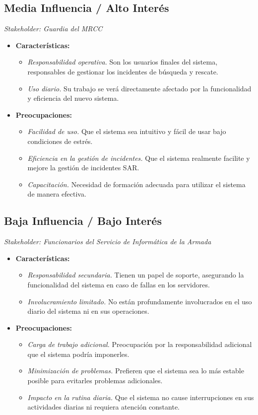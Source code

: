 \subsection{Media Influencia / Alto Interés} 
\textit{Stakeholder: Guardia del MRCC}
\begin{itemize}
    \item \textbf{Características:}
    \begin{itemize}
        \item \textit{Responsabilidad operativa.} Son los usuarios finales del sistema, responsables de gestionar los incidentes de búsqueda y rescate.
        \item \textit{Uso diario.} Su trabajo se verá directamente afectado por la funcionalidad y eficiencia del nuevo sistema.
    \end{itemize}
    \item \textbf{Preocupaciones:}
    \begin{itemize}
        \item \textit{Facilidad de uso.} Que el sistema sea intuitivo y fácil de usar bajo condiciones de estrés.
        \item \textit{Eficiencia en la gestión de incidentes.} Que el sistema realmente facilite y mejore la gestión de incidentes SAR.
        \item \textit{Capacitación.} Necesidad de formación adecuada para utilizar el sistema de manera efectiva.
    \end{itemize}
\end{itemize}


\subsection{Baja Influencia / Bajo Interés} 
\textit{Stakeholder: Funcionarios del Servicio de Informática de la Armada}
\begin{itemize}
    \item \textbf{Características:}
    \begin{itemize}
        \item \textit{Responsabilidad secundaria.} Tienen un papel de soporte, asegurando la funcionalidad del sistema en caso de fallas en los servidores.
        \item \textit{Involucramiento limitado.} No están profundamente involucrados en el uso diario del sistema ni en sus operaciones.
    \end{itemize}
    \item \textbf{Preocupaciones:}
    \begin{itemize}
        \item \textit{Carga de trabajo adicional.} Preocupación por la responsabilidad adicional que el sistema podría imponerles.
        \item \textit{Minimización de problemas.} Prefieren que el sistema sea lo más estable posible para evitarles problemas adicionales.
        \item \textit{Impacto en la rutina diaria.} Que el sistema no cause interrupciones en sus actividades diarias ni requiera atención constante.
    \end{itemize}
\end{itemize}
